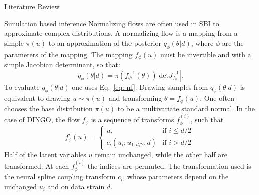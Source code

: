 \documentclass[a4paper, 12pt, twoside, openright, titlepage]{book}
\begin{document}
\begin{chapter}{Literature Review}
\begin{section}{Simulation based inference}
Normalizing flows are often used in SBI to approximate complex distributions.
A normalizing flow is a mapping from a simple $\pi(u)$ to an approximation of the posterior $q_{\phi}(\theta|d)$, where $\phi$ are the parameters of the mapping. 
The mapping $f_{\phi}(u)$ must be invertible and with a simple Jacobian determinant, so that:
\begin{equation}
\label{eq: nf}
q_{\phi}(\theta|d) = \pi(f_{\phi}^{-1}(\theta))\left|\textrm{det}J_{f_{\phi}}^{-1}\right|.
\end{equation}
To evaluate $q_{\phi}(\theta|d)$ one uses Eq.~\ref{eq: nf}. Drawing samples from $q_{\phi}(\theta|d)$ is equivalent to drawing $u\sim\pi(u)$ and transforming $\theta=f_{\phi}(u)$.
One often chooses the base distribution $\pi(u)$ to be a multivariate standard normal.
In the case of DINGO, the flow $f_{\phi}$ is a sequence of transforms $f_{\phi}^{(i)}$, such that
\begin{equation}
f_{\phi}^{i}(u) = 
\begin{cases}
u_{i} & \text{if } i\leq d/2 \\
c_{i}(u_{i}; u_{1:{d/2}},d) & \text{if } i> d/2
\end{cases}.
\end{equation}
Half of the latent variables $u$ remain unchanged, while the other half are transformed.
At each $f_{\phi}^{(i)}$ the indices are permuted.
The transformation used is the neural spline coupling transform $c_{i}$, whose parameters depend on the unchanged $u_{i}$ and on data strain $d$.


\end{section}
\end{chapter}
\end{document}

